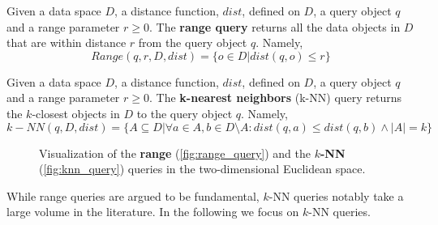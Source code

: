 \begin{definition}
Given a data space $D$, a distance function, $dist$, defined on $D$, a query object $q$ and a range parameter $r \geq 0$. The \textbf{range query} returns all the data objects in $D$ that are within distance $r$ from the query object $q$. Namely,
\begin{equation}
Range(q,r,D,dist)=\{o \in D | dist(q,o) \leq r \}
\end{equation}
\label{def:range_query} 
\end{definition}

\begin{definition}
Given a data space $D$, a distance function, $dist$, defined on $D$, a query object $q$ and a range parameter $r \geq 0$. The \textbf{k-nearest neighbors} (k-NN) query returns the $k$-closest objects in $D$ to the query object $q$. Namely,
\begin{equation}
k-NN(q,D,dist)=\{A \subseteq D | \forall a \in A, b \in D \setminus A: dist(q,a) \leq dist(q,b) \wedge |A|=k \}
\end{equation}
\label{def:knn_query} 
\end{definition}

\begin{figure}[h!]
	\centering
    \caption{Visualization of the \textbf{range} (\ref{fig:range_query}) and the \textbf{$k$-NN} (\ref{fig:knn_query}) queries in the two-dimensional Euclidean space.}
   \label{fig:similarity_query_types}
\end{figure}
While range queries are argued to be fundamental, $k$-NN queries notably take a large volume in the literature. In the following we focus on $k$-NN queries.

